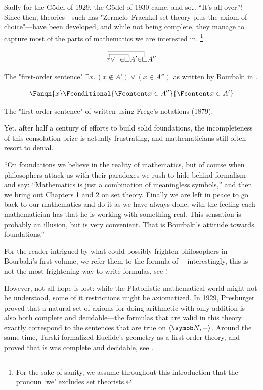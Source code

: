 Sadly for the Gödel of 1929, the Gödel of 1930 came, and so… ``It's all over''!
Since then, theories---such has
"Zermelo–Fraenkel set theory plus the axiom of choice"---have been developed, and while not being complete, they 
manage to capture most of the parts of mathematics we are interested in.%
\footnote{For the sake of sanity, we assume
throughout this introduction that the pronoun `we' excludes set theorists.}
\begin{marginfigure}
	\centering
	\[
	\contraction{}{\tau\,}{{\vee} {\neg} {\in}}{\!\square}
	\contraction[2ex]{}{\tau\!}{{\vee} {\neg} {\in} \square A' {\in}}{\square}
	\tau {\vee} {\neg} {\in} \square A' {\in} \square A''
	\]
	\caption{\AP\label{fig:intro-bourbaki}
	The "first-order sentence" $\exists x.\, (x \not\in A') \lor (x \in A'')$
	as written by Bourbaki in \cite[\S~1]{Bourbaki2006Logique}.
	}
\end{marginfigure}
\begin{marginfigure}
	\centering
	\[
		\Fanqn{x}\Fconditional{\Fcontent x \in A''}{\Fcontent x \in A'}
	\]
	\caption{\AP\label{fig:intro-frege}
		The "first-order sentence" of 
		written using Frege's notations (1879).
	}
\end{marginfigure}
Yet, after half a century of efforts to build solid foundations,
the incompleteness of this consolation prize is actually frustrating,
and mathematicians still often resort to denial.
\begin{displayquote}
	``On foundations we believe in the reality of mathematics, but of course when philosophers attack us with their paradoxes we rush to hide behind formalism and say: ``Mathematics is just a combination of meaningless symbols,'' and then we bring out Chapters 1 and 2 on set theory. Finally we are left in peace to go back to our mathematics and do it as we have always done, with the feeling each mathematician has that he is working with something real.
	This sensation is probably an illusion, but is very convenient. That is Bourbaki's attitude towards foundations.''
\end{displayquote}
For the reader intrigued by what could possibly frighten philosophers in Bourbaki's first volume,
we refer them to the formula of ---interestingly, this is not the most 
frightening way to write formulas, see !

However, not all hope is lost: while the Platonistic mathematical world might
not be understood, some of it restrictions might be axiomatized.
In 1929, Presburger proved that a natural set of axioms for doing
arithmetic with only addition is also both complete and decidable---the formulas
that are valid in this theory exactly correspond to the sentences that are true on $\tup{\N,+}$.
Around the same time, Tarski formalized Euclide's geometry as a first-order theory, and proved
that is was complete and decidable, see \cite{TarskiGivant1999Geometry}.

